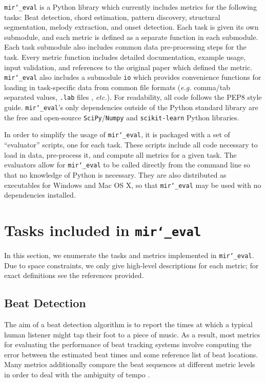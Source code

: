 \documentclass{article}
\def\eg{\emph{e.g.}}
\def\etc{\emph{etc.}}
\def\mireval{\texttt{mir\char`_eval}}
\begin{document}
\mireval{} is a Python library which currently includes metrics for the following tasks: Beat detection, chord estimation, pattern discovery, structural segmentation, melody extraction, and onset detection.
Each task is given its own submodule, and each metric is defined as a separate function in each submodule.
Each task submodule also includes common data pre-processing steps for the task.
Every metric function includes detailed documentation, example usage, input validation, and references to the original paper which defined the metric.
\mireval{} also includes a submodule \texttt{io} which provides convenience functions for loading in task-specific data from common file formats (\eg{} comma/tab separated values, \texttt{.lab} files \cite{harte2010towards}, \etc{}).
For readability, all code follows the PEP8 style guide\cite{van2001pep}.
\mireval{}'s only dependencies outside of the Python standard library are the free and open-source \texttt{SciPy}/\texttt{Numpy}\cite{jones2001scipy} and \texttt{scikit-learn}\cite{pedregosa2011scikit} Python libraries.

In order to simplify the usage of \mireval{}, it is packaged with a set of ``evaluator'' scripts, one for each task.
These scripts include all code necessary to load in data, pre-process it, and compute all metrics for a given task.
The evaluators allow for \mireval{} to be called directly from the command line so that no knowledge of Python is necessary.
They are also distributed as executables for Windows and Mac OS X, so that \mireval{} may be used with no dependencies installed.

\section{Tasks included in \mireval{}}
\label{sec:tasks}

In this section, we enumerate the tasks and metrics implemented in \mireval{}.
Due to space constraints, we only give high-level descriptions for each metric; for exact definitions see the references provided.

\subsection{Beat Detection}

The aim of a beat detection algorithm is to report the times at which a typical human listener might tap their foot to a piece of music.
As a result, most metrics for evaluating the performance of beat tracking systems involve computing the error between the estimated beat times and some reference list of beat locations.
Many metrics additionally compare the beat sequences at different metric levels in order to deal with the ambiguity of tempo \cite{davies2009evaluation}.
\end{document}

